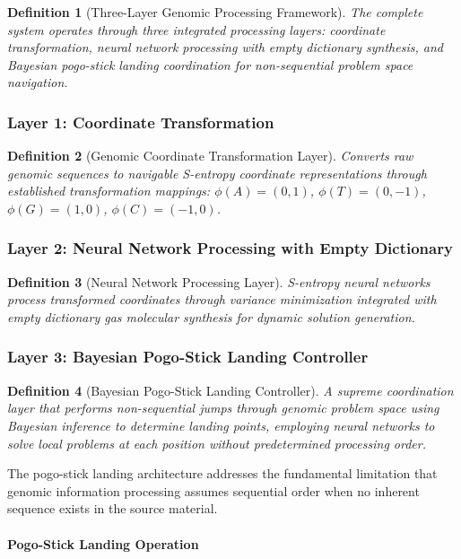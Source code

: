 \documentclass[12pt,a4paper]{article}
\newtheorem{definition}{Definition}
\begin{document}
\begin{definition}[Three-Layer Genomic Processing Framework]
The complete system operates through three integrated processing layers: coordinate transformation, neural network processing with empty dictionary synthesis, and Bayesian pogo-stick landing coordination for non-sequential problem space navigation.
\end{definition}

\subsubsection{Layer 1: Coordinate Transformation}
\begin{definition}[Genomic Coordinate Transformation Layer]
Converts raw genomic sequences to navigable S-entropy coordinate representations through established transformation mappings: $\phi(A) = (0,1)$, $\phi(T) = (0,-1)$, $\phi(G) = (1,0)$, $\phi(C) = (-1,0)$.
\end{definition}

\subsubsection{Layer 2: Neural Network Processing with Empty Dictionary}
\begin{definition}[Neural Network Processing Layer]
S-entropy neural networks process transformed coordinates through variance minimization integrated with empty dictionary gas molecular synthesis for dynamic solution generation.
\end{definition}

\subsubsection{Layer 3: Bayesian Pogo-Stick Landing Controller}
\begin{definition}[Bayesian Pogo-Stick Landing Controller]
A supreme coordination layer that performs non-sequential jumps through genomic problem space using Bayesian inference to determine landing points, employing neural networks to solve local problems at each position without predetermined processing order.
\end{definition}

The pogo-stick landing architecture addresses the fundamental limitation that genomic information processing assumes sequential order when no inherent sequence exists in the source material.

\paragraph{Pogo-Stick Landing Operation}
\end{document}
